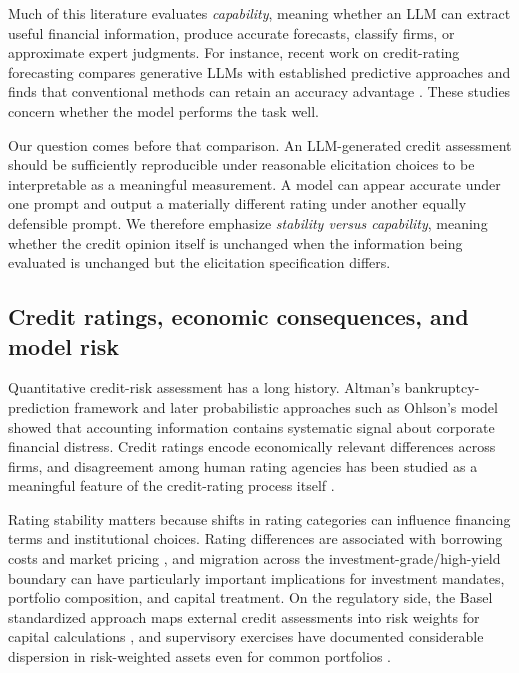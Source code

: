 \documentclass[a4paper,fleqn]{cas-sc}
\begin{document}
Much of this literature evaluates \emph{capability}, meaning whether an LLM can extract useful financial
information, produce accurate forecasts, classify firms, or approximate expert judgments. For instance,
recent work on credit-rating forecasting compares generative LLMs with established predictive approaches
and finds that conventional methods can retain an accuracy advantage \citep{drinkall2025forecasting}.
These studies concern whether the model performs the task well.

Our question comes before that comparison. An LLM-generated credit assessment should be sufficiently
reproducible under reasonable elicitation choices to be interpretable as a meaningful measurement. A
model can appear accurate under one prompt and output a materially different rating under another equally
defensible prompt. We therefore emphasize \emph{stability versus capability}, meaning whether the credit opinion
itself is unchanged when the information being evaluated is unchanged but the elicitation specification
differs.

\subsection{Credit ratings, economic consequences, and model risk}
Quantitative credit-risk assessment has a long history. Altman's bankruptcy-prediction framework
\citep{altman1968} and later probabilistic approaches such as Ohlson's model \citep{ohlson1980} showed
that accounting information contains systematic signal about corporate financial distress. Credit ratings
encode economically relevant differences across firms, and disagreement among human rating agencies has
been studied as a meaningful feature of the credit-rating process itself
\citep{cantorpacker1997,kligersarig2000,tang2009}.

Rating stability matters because shifts in rating categories can influence financing terms and
institutional choices. Rating differences are associated with borrowing costs and
market pricing \citep{kligersarig2000,tang2009,cornaggia2018}, and migration across the
investment-grade/high-yield boundary can have particularly important implications for investment
mandates, portfolio composition, and capital treatment. On the regulatory side, the Basel standardized
approach maps external credit assessments into risk weights for capital calculations
\citep{bcbs2019cre20}, and supervisory exercises have documented considerable dispersion in risk-weighted
assets even for common portfolios \citep{bcbs2013rcap}.
\end{document}
